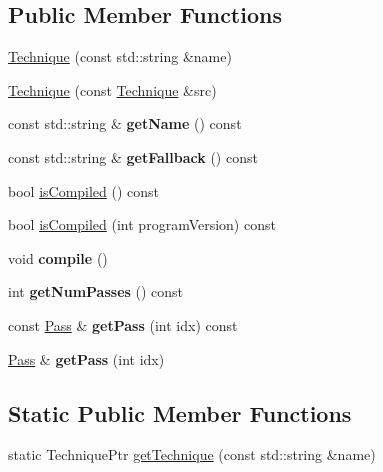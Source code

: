 \subsection*{Public Member Functions}
\begin{DoxyCompactItemize}
\item 
\hyperlink{classTechnique_a6ec998ae20fed03ff4ade4f9f7b00aa1}{Technique} (const std\+::string \&name)
\item 
\hyperlink{classTechnique_ae264b85d6b6e13a99d9e9e5a6de7685b}{Technique} (const \hyperlink{classTechnique}{Technique} \&src)
\item 
const std\+::string \& {\bfseries get\+Name} () const \hypertarget{classTechnique_a87196dbad9850c93b6cb2841ca9da246}{}\label{classTechnique_a87196dbad9850c93b6cb2841ca9da246}

\item 
const std\+::string \& {\bfseries get\+Fallback} () const \hypertarget{classTechnique_aba9c8a25dbe5dcdde06382ad290865b2}{}\label{classTechnique_aba9c8a25dbe5dcdde06382ad290865b2}

\item 
bool \hyperlink{classTechnique_a2825c12a76cea39071b5aed141e0be1e}{is\+Compiled} () const 
\item 
bool \hyperlink{classTechnique_a0ad1df3b45f3bb1af6b8f1a45ee4f303}{is\+Compiled} (int program\+Version) const 
\item 
void {\bfseries compile} ()\hypertarget{classTechnique_a59d75c659a493c34bc50bff073d3c618}{}\label{classTechnique_a59d75c659a493c34bc50bff073d3c618}

\item 
int {\bfseries get\+Num\+Passes} () const \hypertarget{classTechnique_a32cec6389ba41c49a217763943d3bfea}{}\label{classTechnique_a32cec6389ba41c49a217763943d3bfea}

\item 
const \hyperlink{classTechnique_1_1Pass}{Pass} \& {\bfseries get\+Pass} (int idx) const \hypertarget{classTechnique_aa871113528c92b7fadf0c4b8a338fa0a}{}\label{classTechnique_aa871113528c92b7fadf0c4b8a338fa0a}

\item 
\hyperlink{classTechnique_1_1Pass}{Pass} \& {\bfseries get\+Pass} (int idx)\hypertarget{classTechnique_a67fa278c69126eb2e49e0326eaf08a1a}{}\label{classTechnique_a67fa278c69126eb2e49e0326eaf08a1a}

\end{DoxyCompactItemize}
\subsection*{Static Public Member Functions}
\begin{DoxyCompactItemize}
\item 
static Technique\+Ptr \hyperlink{classTechnique_a0e3aa18e00f5c00377000abf9f557d8e}{get\+Technique} (const std\+::string \&name)
\end{DoxyCompactItemize}
